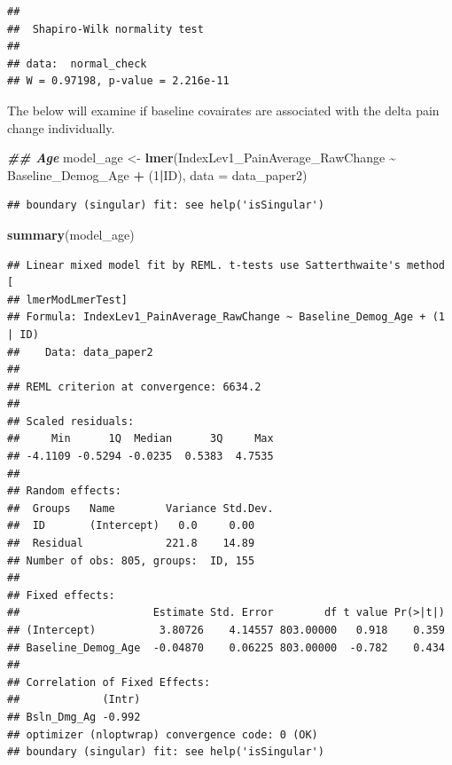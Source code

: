 \documentclass[
  12pt,
]{article}
\newenvironment{Shaded}{\begin{snugshade}}{\end{snugshade}}
\newcommand{\AttributeTok}[1]{\textcolor[rgb]{0.13,0.29,0.53}{#1}}
\newcommand{\CommentTok}[1]{\textcolor[rgb]{0.56,0.35,0.01}{\textit{#1}}}
\newcommand{\DecValTok}[1]{\textcolor[rgb]{0.00,0.00,0.81}{#1}}
\newcommand{\DocumentationTok}[1]{\textcolor[rgb]{0.56,0.35,0.01}{\textbf{\textit{#1}}}}
\newcommand{\FunctionTok}[1]{\textcolor[rgb]{0.13,0.29,0.53}{\textbf{#1}}}
\newcommand{\NormalTok}[1]{#1}
\newcommand{\OtherTok}[1]{\textcolor[rgb]{0.56,0.35,0.01}{#1}}
\newcommand{\SpecialCharTok}[1]{\textcolor[rgb]{0.81,0.36,0.00}{\textbf{#1}}}
\begin{document}
\begin{Shaded}
\end{Shaded}

\begin{verbatim}
## 
##  Shapiro-Wilk normality test
## 
## data:  normal_check
## W = 0.97198, p-value = 2.216e-11
\end{verbatim}

The below will examine if baseline covairates are associated with the
delta pain change individually.

\begin{Shaded}
\begin{Highlighting}[]
\DocumentationTok{\#\# Age}
\NormalTok{model\_age }\OtherTok{\textless{}{-}} \FunctionTok{lmer}\NormalTok{(IndexLev1\_PainAverage\_RawChange }\SpecialCharTok{\textasciitilde{}}\NormalTok{ Baseline\_Demog\_Age }\SpecialCharTok{+}\NormalTok{ (}\DecValTok{1}\SpecialCharTok{|}\NormalTok{ID), }\AttributeTok{data =}\NormalTok{ data\_paper2)}
\end{Highlighting}
\end{Shaded}

\begin{verbatim}
## boundary (singular) fit: see help('isSingular')
\end{verbatim}

\begin{Shaded}
\begin{Highlighting}[]
\FunctionTok{summary}\NormalTok{(model\_age)}
\end{Highlighting}
\end{Shaded}

\begin{verbatim}
## Linear mixed model fit by REML. t-tests use Satterthwaite's method [
## lmerModLmerTest]
## Formula: IndexLev1_PainAverage_RawChange ~ Baseline_Demog_Age + (1 | ID)
##    Data: data_paper2
## 
## REML criterion at convergence: 6634.2
## 
## Scaled residuals: 
##     Min      1Q  Median      3Q     Max 
## -4.1109 -0.5294 -0.0235  0.5383  4.7535 
## 
## Random effects:
##  Groups   Name        Variance Std.Dev.
##  ID       (Intercept)   0.0     0.00   
##  Residual             221.8    14.89   
## Number of obs: 805, groups:  ID, 155
## 
## Fixed effects:
##                     Estimate Std. Error        df t value Pr(>|t|)
## (Intercept)          3.80726    4.14557 803.00000   0.918    0.359
## Baseline_Demog_Age  -0.04870    0.06225 803.00000  -0.782    0.434
## 
## Correlation of Fixed Effects:
##             (Intr)
## Bsln_Dmg_Ag -0.992
## optimizer (nloptwrap) convergence code: 0 (OK)
## boundary (singular) fit: see help('isSingular')
\end{verbatim}
\end{document}
